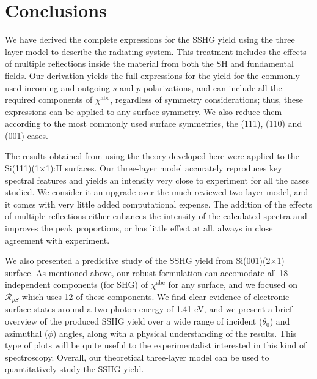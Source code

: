 \documentclass[aps,prb,10pt,showpacs,letterpaper,twocolumn]{revtex4-1}
\begin{document}

\section{Conclusions}\label{sec:conclusions}

We have derived the complete expressions for the SSHG yield using the three
layer model to describe the radiating system. This treatment includes the
effects of multiple reflections inside the material from both the SH and
fundamental fields. Our derivation yields the full expressions for the yield for
the commonly used incoming and outgoing $s$ and $p$ polarizations, and can
include all the required components of $\chi^{\mathrm{abc}}$, regardless of
symmetry considerations; thus, these expressions can be applied to any surface
symmetry. We also reduce them according to the most commonly used surface
symmetries, the (111), (110) and (001) cases.

The results obtained from using the theory developed here were applied to the
Si(111)(1$\times$1):H surfaces. Our three-layer model accurately reproduces key
spectral features and yields an intensity very close to experiment for all the
cases studied. We consider it an upgrade over the much reviewed two layer
model,\cite{mizrahiJOSA88} and it comes with very little added computational
expense. The addition of the effects of multiple reflections either enhances the
intensity of the calculated spectra and improves the peak proportions, or has
little effect at all, always in close agreement with experiment.

We also presented a predictive study of the SSHG yield from Si(001)(2$\times$1)
surface. As mentioned above, our robust formulation can accomodate all 18
independent components (for SHG) of $\chi^{\mathrm{abc}}$ for any surface, and
we focused on $\mathcal{R}_{pS}$ which uses 12 of these components. We find
clear evidence of electronic surface states around a two-photon energy of 1.41
eV, and we present a brief overview of the produced SSHG yield over a wide range
of incident ($\theta_{0}$) and azimuthal ($\phi$) angles, along with a physical
understanding of the results. This type of plots will be quite useful to the
experimentalist interested in this kind of spectroscopy. Overall, our
theoretical three-layer model can be used to quantitatively study the SSHG
yield.
\end{document}
